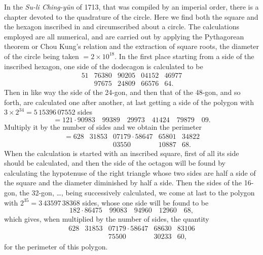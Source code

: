 \documentclass[11pt]{article}
\newcommand{\scanfooter}{}
\begin{document}
In the \emph{Su-li Ching-yün} of 1713, that was compiled by an imperial order, there is a chapter devoted to the quadrature of the circle. Here we find both the square and the hexagon inscribed in and circumscribed about a circle. The calculations employed are all numerical, and are carried out by applying the Pythagorean theorem or Chou Kung's relation and the extraction of square roots, the diameter of the circle being taken $=2\times10^{18}$. In the first place starting from a side of the inscribed hexagon, one side of the dodecagon is calculated to be
\[
\begin{array}{rrrrr}
51&76380&90205&04152&46977\\
&97675&24809&66576&64.
\end{array}
\]
Then in like way the side of the 24-gon, and then that of the 48-gon, and so forth, are calculated one after another, at last getting a side of the polygon with $3\times2^{34}=5\,15396\,07552$ sides
\[
=121\cdot90983\quad 99389\quad 29973\quad 41424\quad 79879\quad 09.
\]
Multiply it by the number of sides and we obtain the perimeter
\[
\begin{array}{rrrrrr}
=628&31853&07179\cdot58647&65801&34822\\
&&03550&10887&68.
\end{array}
\]
When the calculation is started with an inscribed square, first of all its side should be calculated, and then the side of the octagon will be found by calculating the hypotenuse of the right triangle whose two sides are half a side of the square and the diameter diminished by half a side. Then the sides of the 16-gon, the 32-gon, \ldots, being successively calculated, we come at last to the polygon with $2^{35}=3\,43597\,38368$ sides, whose one side will be found to be
\[
182\cdot86475\quad 99083\quad 94960\quad 12960\quad 68,
\]
which gives, when multiplied by the number of sides, the quantity
\[
\begin{array}{rrrrrr}
628&31853&07179\cdot58647&68630&83106\\
&&75500&30233&60,
\end{array}
\]
for the perimeter of this polygon.
\scanfooter
\end{document}
